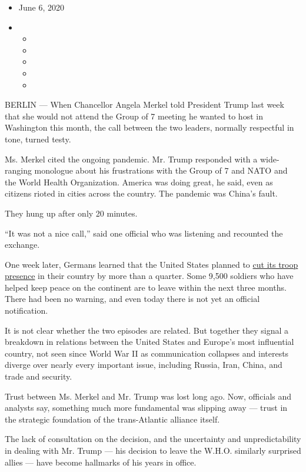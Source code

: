 \begin{itemize}
\item
  June 6, 2020
\item
  \begin{itemize}
  \item
  \item
  \item
  \item
  \item
  \end{itemize}
\end{itemize}

BERLIN --- When Chancellor Angela Merkel told President Trump last week
that she would not attend the Group of 7 meeting he wanted to host in
Washington this month, the call between the two leaders, normally
respectful in tone, turned testy.

Ms. Merkel cited the ongoing pandemic. Mr. Trump responded with a
wide-ranging monologue about his frustrations with the Group of 7 and
NATO and the World Health Organization. America was doing great, he
said, even as citizens rioted in cities across the country. The pandemic
was China's fault.

They hung up after only 20 minutes.

``It was not a nice call,'' said one official who was listening and
recounted the exchange.

One week later, Germans learned that the United States planned to
\href{https://www.nytimes.com/2020/06/05/world/europe/trump-troops-europe-nato-germany.html?searchResultPosition=2}{cut
its troop presence} in their country by more than a quarter. Some 9,500
soldiers who have helped keep peace on the continent are to leave within
the next three months. There had been no warning, and even today there
is not yet an official notification.

It is not clear whether the two episodes are related. But together they
signal a breakdown in relations between the United States and Europe's
most influential country, not seen since World War II as communication
collapses and interests diverge over nearly every important issue,
including Russia, Iran, China, and trade and security.

Trust between Ms. Merkel and Mr. Trump was lost long ago. Now, officials
and analysts say, something much more fundamental was slipping away ---
trust in the strategic foundation of the trans-Atlantic alliance itself.

The lack of consultation on the decision, and the uncertainty and
unpredictability in dealing with Mr. Trump --- his decision to leave the
W.H.O. similarly surprised allies --- have become hallmarks of his years
in office.

